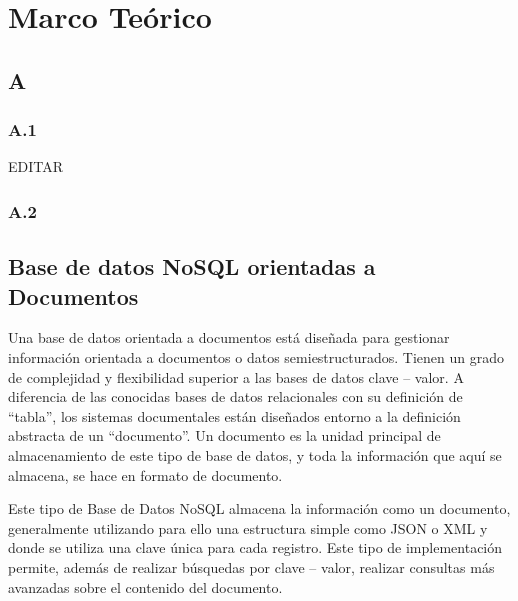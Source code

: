 \documentclass[preprint,12pt]{elsarticle}
\begin{document}



\section{Marco Teórico}


\subsection {\textbf{A}}

\subsubsection{\textbf{A.1}}

EDITAR \cite{SQLne}  %

\subsubsection{\textbf{A.2}}


\subsection {\textbf{Base de datos NoSQL orientadas a Documentos}}
Una base de datos orientada a documentos está diseñada para gestionar información orientada a documentos o datos semiestructurados. Tienen un grado de complejidad y flexibilidad superior a las bases de datos clave – valor. \newline
A diferencia de las conocidas bases de datos relacionales con su definición de “tabla”, los sistemas documentales están diseñados entorno a la definición abstracta de un “documento”. Un documento es la unidad principal de almacenamiento de este tipo de base de datos, y toda la información que aquí se almacena, se hace en formato de documento. \newline

Este tipo de Base de Datos NoSQL almacena la información como un documento, generalmente utilizando para ello una estructura simple como JSON o XML y donde se utiliza una clave única para cada registro. Este tipo de implementación permite, además de realizar búsquedas por clave – valor, realizar consultas más avanzadas sobre el contenido del documento.
\end{document}
